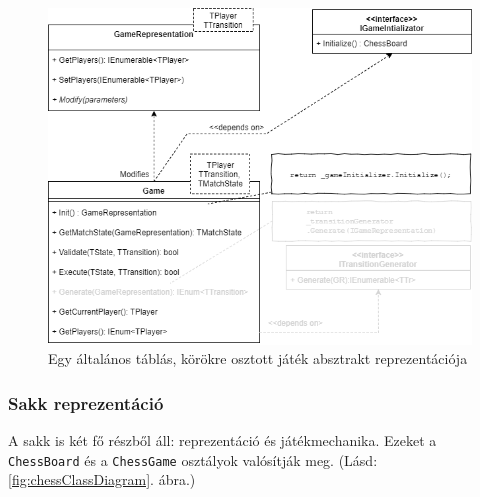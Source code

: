 \documentclass[twoside, a4paper, 12pt]{article}
\begin{document}
\begin{figure}[htbp]
	\centering
	\includegraphics[width=\textwidth]{img/boardGameAbstractClassDiagram.png}
	\caption{Egy általános táblás, körökre osztott játék absztrakt reprezentációja}
	\label{fig:boardGameAbstractClassDiagram}
\end{figure}


\subsubsection{Sakk reprezentáció}

A sakk is két fő részből áll: reprezentáció és játékmechanika. Ezeket a \texttt{ChessBoard} és a \texttt{ChessGame} osztályok valósítják meg. (Lásd: \ref{fig:chessClassDiagram}. ábra.)
\end{document}
